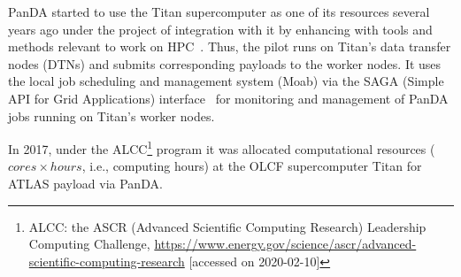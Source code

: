 PanDA started to use the Titan supercomputer as one of its resources several years ago under the project of integration with it by enhancing with tools and methods relevant to work on HPC~\cite{ref-titan-prodsys}. Thus, the pilot runs on Titan's data transfer nodes (DTNs) and submits corresponding payloads to the worker nodes. It uses the local job scheduling and management system (Moab) via the SAGA (Simple API for Grid Applications) interface~\cite{ref-saga} for monitoring and management of PanDA jobs running on Titan's worker nodes.

In 2017, under the ALCC\footnote{ALCC: the ASCR (Advanced Scientific Computing Research) Leadership Computing Challenge, \url{https://www.energy.gov/science/ascr/advanced-scientific-computing-research} [accessed on 2020-02-10]} program it was allocated computational resources ($cores \times hours$, i.e., computing hours) at the OLCF supercomputer Titan for ATLAS payload via PanDA.
